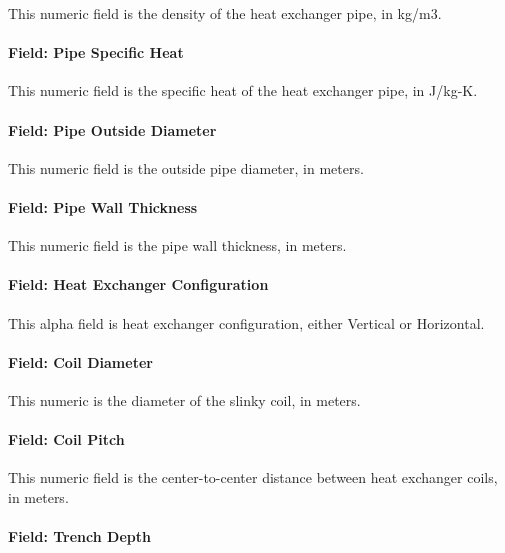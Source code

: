 This numeric field is the density of the heat exchanger pipe, in kg/m3.

\paragraph{Field: Pipe Specific Heat}\label{field-pipe-specific-heat}

This numeric field is the specific heat of the heat exchanger pipe, in J/kg-K.

\paragraph{Field: Pipe Outside Diameter}\label{field-pipe-outside-diameter}

This numeric field is the outside pipe diameter, in meters.

\paragraph{Field: Pipe Wall Thickness}\label{field-pipe-wall-thickness}

This numeric field is the pipe wall thickness, in meters.

\paragraph{Field: Heat Exchanger Configuration}\label{field-heat-exchanger-configuration}

This alpha field is heat exchanger configuration, either Vertical or Horizontal.

\paragraph{Field: Coil Diameter}\label{field-coil-diameter}

This numeric is the diameter of the slinky coil, in meters.

\paragraph{Field: Coil Pitch}\label{field-coil-pitch}

This numeric field is the center-to-center distance between heat exchanger coils, in meters.

\paragraph{Field: Trench Depth}\label{field-trench-depth}

